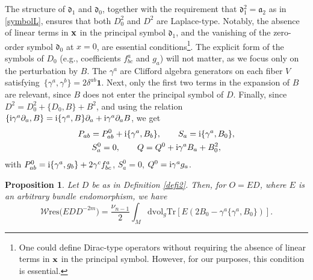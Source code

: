 \documentclass[pdftex]{sigma}
\numberwithin{equation}{section}
\newtheorem{Proposition}[Theorem]{Proposition}
\theoremstyle{definition}
\def\W{\mathscr{W} \mathrm{res}}
\def\Tr{\mathrm{Tr}}
\def\dv{\mathrm{dvol}_g}
\begin{document}
The structure of $\mathfrak{d}_1$ and $\mathfrak{d}_0$, together with the requirement that $\mathfrak{d}_1^2 = \mathfrak{a}_2$ as in \eqref{symbolL}, ensures that both $D_0^2$ and $D^2$ are Laplace-type. Notably, the absence of linear terms in ${\bf x}$ in the principal symbol $\mathfrak{d}_1$, and the vanishing of the zero-order symbol $\mathfrak{d}_0$ at $x=0$, are essential conditions\footnote{One could define Dirac-type operators without requiring the absence of linear terms in ${\bf x}$ in the principal symbol. However, for our purposes, this condition is essential.}. The explicit form of the symbols of $D_0$ (e.g., coefficients $f^a_{bc}$ and $g_a$) will not matter, as we focus only on the perturbation by $B$. The $\gamma^a$ are Clifford algebra generators on each fiber $V$ satisfying~${\bigl\{\gamma^a,\gamma^b\bigr\} = 2\delta^{ab}\mathbf{1}}$. Next, only the first two terms in the expansion of $B$ are relevant, since $B$ does not enter the principal symbol of $D$. Finally, since $D^2=D_0^2+\{D_0, B\}+B^2$, and using the relation $\{{\rm i}\gamma^a \partial_a, B\} = {\rm i}\{\gamma^a, B\} \partial_a + {\rm i}\gamma^a \partial_a B$, we get
	\begin{gather}
			 P_{ab} = P_{ab}^0 + {\rm i}\{\gamma^a, B_b\}, \qquad S_a = {\rm i}\{\gamma^a, B_0\}, \nonumber\\
			 S_a^0 = 0, \qquad Q = Q^0 + {\rm i}\gamma^a B_a + B_0^2,\label{eq:PSQ}
	\end{gather}
 with $P^0_{ab}={\rm i}\{\gamma^a,g_b\}+2\gamma^cf^a_{bc}$,
$S_a^0=0$, $ Q^0={\rm i}\gamma^ag_a$.
\begin{Proposition}
	\label{lemma:ED}
	Let $D$ be as in Definition {\rm\ref{defi2}}. Then, for $O = ED$, where $E$ is an arbitrary bundle endomorphism, we have
	\[%
			\W\bigl(EDD^{-2m}\bigr)=
			\frac{\nu_{n-1}}{2}\int_M \dv \Tr\left[ E(2B_0-\gamma^a\{\gamma^a,B_0\}) \right].
		\]
\end{Proposition}
\end{document}
